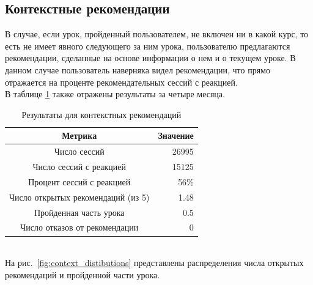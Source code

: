 \documentclass[12pt]{article}
\begin{document}
\subsection{Контекстные рекомендации}
\indent В случае, если урок, пройденный пользователем, не включен ни в какой курс, то есть не имеет явного следующего за ним урока, пользователю предлагаются рекомендации, сделанные на основе информации о нем и о текущем уроке. В данном случае пользователь наверняка видел рекомендации, что прямо отражается на проценте рекомендательных сессий с реакцией.
\\\indent В таблице \ref{tabular:table_context} также отражены результаты за четыре месяца.

\begin{table}[h]
    \caption{Результаты для контекстных рекомендаций}
    \label{tabular:table_context}
    
    \begin{center}
    \begin{tabular}{ c | r }
      \hline
      Метрика & Значение \\
      \hline	
      \hline
      Число сессий & 26995 \\
      Число сессий с реакцией & 15125 \\
      Процент сессий с реакцией &  56\% \\
      Число открытых рекомендаций (из 5) & 1.48 \\
      Пройденная часть урока & 0.5 \\
      Число отказов от рекомендации & 0 \\
      \hline  
    \end{tabular}
    \end{center}
\end{table}


\\\indent На рис.~\ref{fig:context_distibutions} представлены распределения числа открытых рекомендаций и пройденной части урока.
\end{document}
